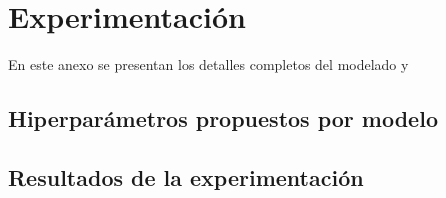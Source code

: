 \chapter{Experimentación}

En este anexo se presentan los detalles completos del modelado y 

\section{Hiperparámetros propuestos por modelo}

\section{Resultados de la experimentación}
